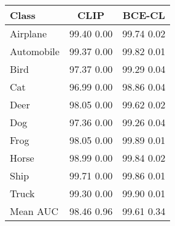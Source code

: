 \documentclass[10pt]{article} \usepackage[accepted]{stylefiles/tmlr}
\begin{document}
\begin{table*}[th]
{\begin{tabular}{lcc}
Class & \multicolumn{1}{c|}{CLIP} & \multicolumn{1}{c}{BCE-CL} \\ 
\midrule 
Airplane & \multicolumn{1}{c|}{99.40  0.00} & \multicolumn{1}{c}{99.74  0.02} \\ 
Automobile & \multicolumn{1}{c|}{99.37  0.00} & \multicolumn{1}{c}{99.82  0.01} \\ 
Bird & \multicolumn{1}{c|}{97.37  0.00} & \multicolumn{1}{c}{99.29  0.04} \\ 
Cat & \multicolumn{1}{c|}{96.99  0.00} & \multicolumn{1}{c}{98.86  0.04} \\ 
Deer & \multicolumn{1}{c|}{98.05  0.00} & \multicolumn{1}{c}{99.62  0.02} \\ 
Dog & \multicolumn{1}{c|}{97.36  0.00} & \multicolumn{1}{c}{99.26  0.04} \\ 
Frog & \multicolumn{1}{c|}{98.05  0.00} & \multicolumn{1}{c}{99.89  0.01} \\ 
Horse & \multicolumn{1}{c|}{98.99  0.00} & \multicolumn{1}{c}{99.84  0.02} \\ 
Ship & \multicolumn{1}{c|}{99.71  0.00} & \multicolumn{1}{c}{99.86  0.01} \\ 
Truck & \multicolumn{1}{c|}{99.30  0.00} & \multicolumn{1}{c}{99.90  0.01} \\ 
\midrule 
Mean AUC & \multicolumn{1}{c|}{98.46  0.96} & \multicolumn{1}{c}{99.61  0.34} \\ 
\bottomrule 
\end{tabular}  }
\end{table*}
\end{document}
